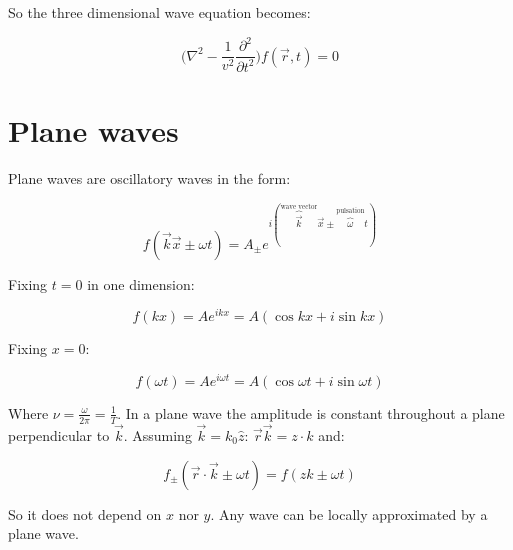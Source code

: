   So the three dimensional wave equation becomes:

  $$\biggl(\nabla^2 - \frac{1}{v^2}\frac{\partial^2{}}{\partial{t^2}}\biggr)f(\vec{r},t) = 0$$

\section{Plane waves}
Plane waves are oscillatory waves in the form:

$$f(\vec{k}\vec{x}\pm\omega t) = A_{\pm}e^{i(\overbrace{\vec{k}}^{\text{wave vector}}\vec{x}\pm\overbrace{\omega}^{\text{pulsation}} t)}$$

Fixing $t = 0$ in one dimension:

$$f(kx) = Ae^{ikx} = A(\cos kx + i\sin kx)$$

Fixing $x = 0$:

$$f(\omega t) = Ae^{i\omega t} = A(\cos\omega t + i\sin\omega t)$$

Where $\nu = \frac{\omega}{2\pi} = \frac{1}{T}$.
In a plane wave the amplitude is constant throughout a plane perpendicular to $\vec{k}$.
Assuming $\vec{k} = k_0\hat{z}$: $\vec{r}\vec{k} = z\cdot k$ and:

$$f_\pm (\vec{r}\cdot \vec{k}\pm\omega t) = f(zk\pm \omega t)$$

So it does not depend on $x$ nor $y$.
Any wave can be locally approximated by a plane wave.


 
